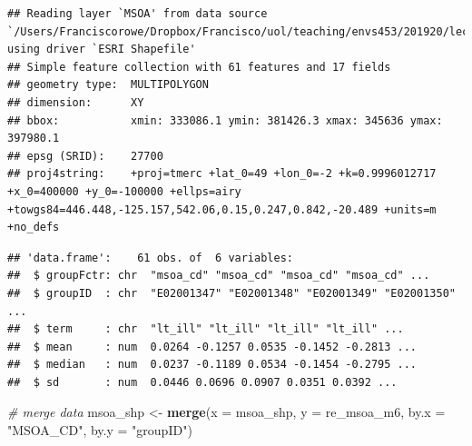 \documentclass[]{book}
\newenvironment{Shaded}{\begin{snugshade}}{\end{snugshade}}
\newcommand{\KeywordTok}[1]{\textcolor[rgb]{0.13,0.29,0.53}{\textbf{#1}}}
\newcommand{\DataTypeTok}[1]{\textcolor[rgb]{0.13,0.29,0.53}{#1}}
\newcommand{\StringTok}[1]{\textcolor[rgb]{0.31,0.60,0.02}{#1}}
\newcommand{\CommentTok}[1]{\textcolor[rgb]{0.56,0.35,0.01}{\textit{#1}}}
\newcommand{\OperatorTok}[1]{\textcolor[rgb]{0.81,0.36,0.00}{\textbf{#1}}}
\newcommand{\NormalTok}[1]{#1}
\begin{document}
\begin{verbatim}
## Reading layer `MSOA' from data source `/Users/Franciscorowe/Dropbox/Francisco/uol/teaching/envs453/201920/lectures/san/data/mlm/MSOA.shp' using driver `ESRI Shapefile'
## Simple feature collection with 61 features and 17 fields
## geometry type:  MULTIPOLYGON
## dimension:      XY
## bbox:           xmin: 333086.1 ymin: 381426.3 xmax: 345636 ymax: 397980.1
## epsg (SRID):    27700
## proj4string:    +proj=tmerc +lat_0=49 +lon_0=-2 +k=0.9996012717 +x_0=400000 +y_0=-100000 +ellps=airy +towgs84=446.448,-125.157,542.06,0.15,0.247,0.842,-20.489 +units=m +no_defs
\end{verbatim}

\begin{Shaded}
\end{Shaded}

\begin{verbatim}
## 'data.frame':    61 obs. of  6 variables:
##  $ groupFctr: chr  "msoa_cd" "msoa_cd" "msoa_cd" "msoa_cd" ...
##  $ groupID  : chr  "E02001347" "E02001348" "E02001349" "E02001350" ...
##  $ term     : chr  "lt_ill" "lt_ill" "lt_ill" "lt_ill" ...
##  $ mean     : num  0.0264 -0.1257 0.0535 -0.1452 -0.2813 ...
##  $ median   : num  0.0237 -0.1189 0.0534 -0.1454 -0.2795 ...
##  $ sd       : num  0.0446 0.0696 0.0907 0.0351 0.0392 ...
\end{verbatim}

\begin{Shaded}
\begin{Highlighting}[]
\CommentTok{# merge data}
\NormalTok{msoa_shp <-}\StringTok{ }\KeywordTok{merge}\NormalTok{(}\DataTypeTok{x =}\NormalTok{ msoa_shp, }\DataTypeTok{y =}\NormalTok{ re_msoa_m6, }\DataTypeTok{by.x =} \StringTok{"MSOA_CD"}\NormalTok{, }\DataTypeTok{by.y =} \StringTok{"groupID"}\NormalTok{)}
\end{Highlighting}
\end{Shaded}
\end{document}
